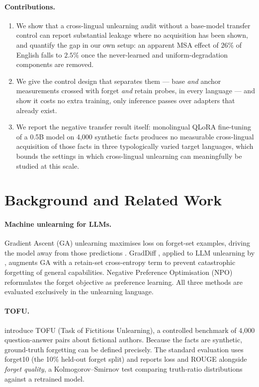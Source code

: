 \documentclass[11pt]{article}
\begin{document}
\paragraph{Contributions.}
\begin{enumerate}
  \item We show that a cross-lingual unlearning audit without a base-model
        transfer control can report substantial leakage where no
        acquisition has been shown, and quantify the gap in our own setup: an
        apparent MSA effect of $26\%$ of English falls to $2.5\%$ once the
        never-learned and uniform-degradation components are removed.
  \item We give the control design that separates them — base
        \emph{and} anchor measurements crossed with forget \emph{and} retain
        probes, in every language — and show it costs no extra training,
        only inference passes over adapters that already exist.
  \item We report the negative transfer result itself: monolingual QLoRA
        fine-tuning of a 0.5B model on 4{,}000 synthetic facts produces no
        measurable cross-lingual acquisition of those facts in three typologically
        varied target languages, which bounds the settings in which
        cross-lingual unlearning can meaningfully be studied at this scale.
\end{enumerate}

\section{Background and Related Work}
\label{sec:related}

\paragraph{Machine unlearning for LLMs.}
Gradient Ascent (GA) unlearning maximises loss on forget-set examples,
driving the model away from those predictions
\citep{jang2023knowledge}.
GradDiff \citep{liu2022continual}, applied to LLM unlearning by
\citet{yao2023llmunlearning}, augments GA with a retain-set
cross-entropy term to prevent catastrophic forgetting of general capabilities.
Negative Preference Optimisation (NPO) \citep{zhang2024npo} reformulates
the forget objective as preference learning.
All three methods are evaluated exclusively in the unlearning language.

\paragraph{TOFU.}
\citet{maini2024tofu} introduce TOFU (Task of Fictitious Unlearning), a
controlled benchmark of 4,000 question-answer pairs about fictional authors.
Because the facts are synthetic, ground-truth forgetting can be defined
precisely.
The standard evaluation uses forget10 (the 10\% held-out forget split) and
reports loss and ROUGE alongside \emph{forget quality}, a
Kolmogorov--Smirnov test comparing truth-ratio distributions against a
retrained model.
\end{document}
